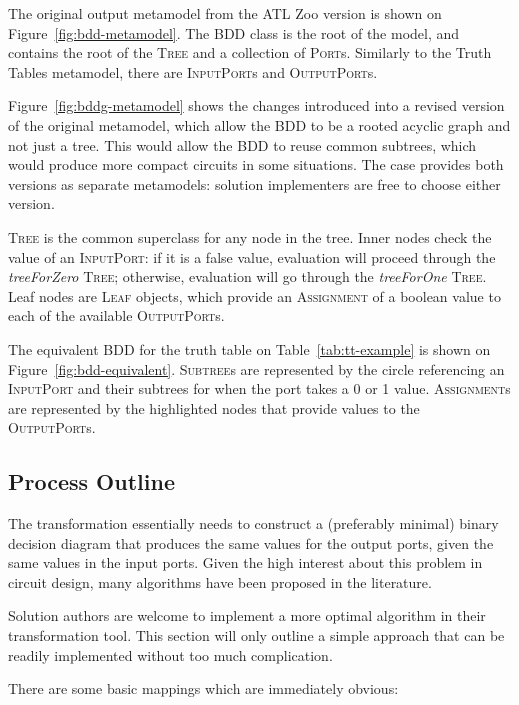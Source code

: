 \documentclass[a4paper]{scrartcl}
\newcommand*{\class}[1]{\textsc{#1}}
\newcommand*{\feature}[1]{\emph{#1}}
\begin{document}
The original output metamodel from the ATL Zoo version is shown on
Figure~\ref{fig:bdd-metamodel}. The \class{BDD} class is the root of the model,
and contains the root of the \class{Tree} and a collection of \class{Port}s.
Similarly to the Truth Tables metamodel, there are \class{Input\-Port}s and
\class{Output\-Port}s.

Figure~\ref{fig:bddg-metamodel} shows the changes introduced into a revised
version of the original metamodel, which allow the \class{BDD} to be a rooted
acyclic graph and not just a tree. This would allow the \class{BDD} to reuse
common subtrees, which would produce more compact circuits in some situations.
The case provides both versions as separate metamodels: solution implementers
are free to choose either version.

\class{Tree} is the common superclass for any node in the tree. Inner nodes
check the value of an \class{Input\-Port}: if it is a false value, evaluation
will proceed through the \feature{tree\-For\-Zero} \class{Tree}; otherwise,
evaluation will go through the \feature{tree\-For\-One} \class{Tree}. Leaf nodes
are \class{Leaf} objects, which provide an \class{Assignment} of a boolean value
to each of the available \class{Output\-Port}s.

The equivalent BDD for the truth table on Table~\ref{tab:tt-example} is shown on
Figure~\ref{fig:bdd-equivalent}. \class{Subtree}s are represented by the circle
referencing an \class{Input\-Port} and their subtrees for when the port takes a
0 or 1 value. \class{Assignment}s are represented by the highlighted nodes that
provide values to the \class{Output\-Port}s.

\subsection{Process Outline}
\label{sec:process-outline}

The transformation essentially needs to construct a (preferably minimal) binary
decision diagram that produces the same values for the output ports, given the
same values in the input ports. Given the high interest about this problem in
circuit design, many algorithms have been proposed in the literature.

Solution authors are welcome to implement a more optimal algorithm in their
transformation tool. This section will only outline a simple approach that can
be readily implemented without too much complication.

There are some basic mappings which are immediately obvious:
\end{document}

